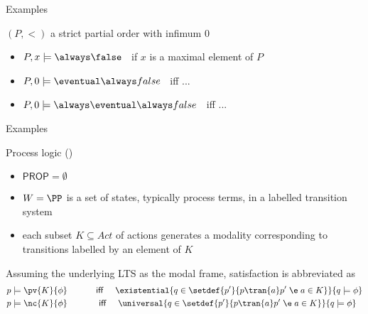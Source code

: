 \documentclass{beamer}
\begin{document}
\begin{slide}{Examples}\label{s:16}
\small
\begin{block}{$(P,<)$ a strict partial order with infimum $0$}
~\\


\begin{itemize}
\item $P, x \models \always \false\; \;$  if $x$ is a maximal element of $P$
\item $P, 0 \models \eventual \always false\; \;$  iff  ... %
\item $P, 0 \models \always \eventual \always false\; \;$  iff  ... %
\end{itemize}
\end{block}
\end{slide}



\begin{slide}{Examples}\label{s:17}
\small
\begin{block}{Process logic ()}
\begin{itemize}
\item $\mathsf{PROP} = \emptyset$
\item $W = \PP$ is a set of states, typically process terms, in a labelled transition system 
\item each subset $K \subseteq Act$ of actions generates a modality corresponding to transitions labelled by an element of $K$ 
\end{itemize}
\end{block}
Assuming the underlying LTS  as the modal frame, satisfaction is abbreviated as
\begin{align*}
p & \models \pv{K}{\phi} \text{ ~~~~~~~~ \textsf{iff} ~~~}
\existential{q \in \setdef{p'}{p \tran{a} p' \; \e\;  a \in K}}{q \models \phi} \\
p & \models \nc{K}{\phi} \text{~~~~~~~~~~ \textsf{iff} ~~~}
\universal{q \in \setdef{p'}{p \tran{a} p' \; \e\;  a \in K}}{q \models \phi} 
\end{align*}
\end{slide}
\end{document}
